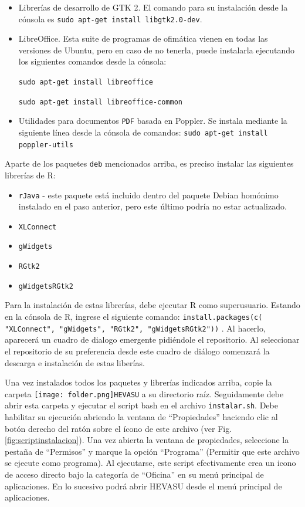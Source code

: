 \documentclass[letterpaper,12pt]{book}
\newcommand{\archivo}[1]
{\texttt{#1}}
\newcommand{\comando}[1]
{\textcolor{commandcolor}{\texttt{#1}}}
\newcommand{\carpeta}[1]
{\texttt{[image: folder.png]}\texttt{#1}}
\begin{document}
\begin{itemize}
	\item Librerías de desarrollo de GTK 2. El comando para su instalación desde la cónsola es \comando{sudo apt-get install libgtk2.0-dev}.
	
	\item LibreOffice. Esta suite de programas de ofimática vienen en todas las versiones de Ubuntu, pero en caso de no tenerla, puede instalarla ejecutando los siguientes comandos desde la cónsola:
	
	\begin{center}
		\parbox{54ex}{
		\comando{sudo apt-get install libreoffice}
		
		\comando{sudo apt-get install libreoffice-common}
		}
	\end{center}
	
	\item Utilidades para documentos \archivo{PDF} basada en Poppler. Se instala mediante la siguiente línea desde la cónsola de comandos: \comando{sudo apt-get install poppler-utils}
\end{itemize}

Aparte de los paquetes \texttt{deb} mencionados arriba, es preciso instalar las siguientes librerías de R:

\begin{itemize}
	\item \texttt{rJava} - este paquete está incluido dentro del paquete Debian homónimo instalado en el paso anterior, pero este último podría no estar actualizado.
	\item \texttt{XLConnect}
	\item \texttt{gWidgets}
	\item \texttt{RGtk2}
	\item \texttt{gWidgetsRGtk2} 
\end{itemize}

Para la instalación de estas librerías, debe ejecutar R como superusuario. Estando en la cónsola de R, ingrese el siguiente comando: \comando{install.packages(c( "XLConnect", "gWidgets", "}\comando{RGtk2}\comando{", "gWidgetsRGtk2"))} . Al hacerlo, aparecerá un cuadro de dialogo emergente pidiéndole el repositorio. Al seleccionar el repositorio de su preferencia desde este cuadro de diálogo comenzará la descarga e instalación de estas liberías.

Una vez instalados todos los paquetes y librerías indicados arriba, copie la carpeta \carpeta{HEVASU} a su directorio raíz. Seguidamente debe abrir esta carpeta y ejecutar el script bash en el archivo \archivo{instalar.sh}. Debe habilitar su ejecución abriendo la ventana de ``Propiedades'' haciendo clic al botón derecho del ratón sobre el ícono de este archivo (ver Fig. \ref{fig:scriptinstalacion}). Una vez abierta la ventana de propiedades, seleccione la pestaña de ``Permisos'' y marque la opción ``Programa'' (Permitir que este archivo se ejecute como programa). Al ejecutarse, este script efectivamente crea un icono de acceso directo bajo la categoría de ``Oficina'' en su menú principal de aplicaciones. En lo sucesivo podrá abrir HEVASU desde el menú principal de aplicaciones. 
\end{document}
